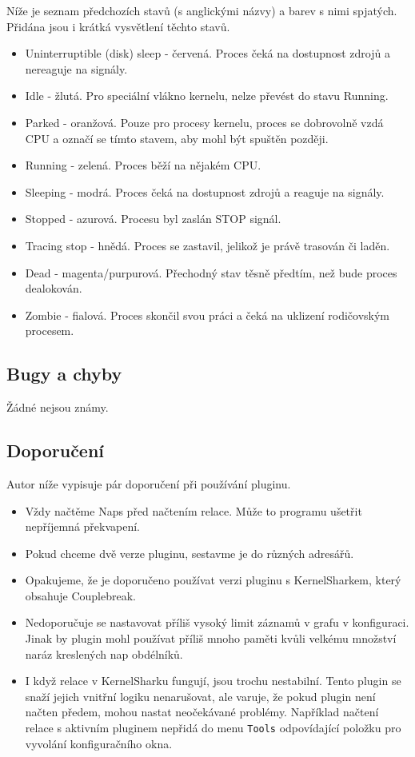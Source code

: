 Níže je seznam předchozích stavů (s anglickými názvy) a barev s nimi spjatých. Přidána jsou i krátká vysvětlení těchto stavů.
\begin{itemize}
  \item Uninterruptible (disk) sleep - červená. Proces čeká na dostupnost zdrojů a nereaguje na signály.
  \item Idle - žlutá. Pro speciální vlákno kernelu, nelze převést do stavu Running.
  \item Parked - oranžová. Pouze pro procesy kernelu, proces se dobrovolně vzdá CPU a označí se tímto stavem, aby mohl být spuštěn později. 
  \item Running - zelená. Proces běží na nějakém CPU.
  \item Sleeping - modrá. Proces čeká na dostupnost zdrojů a reaguje na signály.
  \item Stopped - azurová. Procesu byl zaslán STOP signál.
  \item Tracing stop - hnědá. Proces se zastavil, jelikož je právě trasován či laděn.
  \item Dead - magenta/purpurová. Přechodný stav těsně předtím, než bude proces dealokován.
  \item Zombie - fialová. Proces skončil svou práci a čeká na uklizení rodičovským procesem.
\end{itemize}

\subsection{Bugy a chyby}

Žádné nejsou známy.

\subsection{Doporučení}

Autor níže vypisuje pár doporučení při používání pluginu.
\begin{itemize}
  \item Vždy načtěme Naps před načtením relace. Může to programu ušetřit nepříjemná překvapení.
  \item Pokud chceme dvě verze pluginu, sestavme je do různých adresářů.
  \item Opakujeme, že je doporučeno používat verzi pluginu s KernelSharkem, který obsahuje Couplebreak.
  \item Nedoporučuje se nastavovat příliš vysoký limit záznamů v grafu v konfiguraci. Jinak by plugin mohl používat příliš mnoho paměti kvůli velkému množství naráz kreslených nap obdélníků.
  \item I když relace v KernelSharku fungují, jsou trochu nestabilní. Tento plugin se snaží jejich vnitřní logiku nenarušovat, ale varuje, že pokud plugin není načten předem, mohou nastat neočekávané problémy. Například načtení relace s aktivním pluginem nepřidá do menu \texttt{Tools} odpovídající položku pro vyvolání konfiguračního okna.
\end{itemize}


